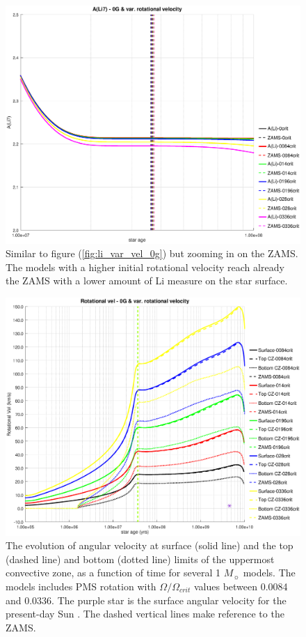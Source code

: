 \documentclass[fleqn,usenatbib]{mnras}
\begin{document}
\begin{figure}
	\includegraphics[trim = 40mm 15mm 20mm 15mm, clip,width=\columnwidth]{figures/li_var_vel_0_0g_z1.eps}
    \caption {Similar to figure (\ref{fig:li_var_vel_0g}) but zooming in on the ZAMS. The models with a higher initial rotational velocity reach already the ZAMS with a lower amount of Li measure on the star surface.}
    \label{fig:li_var_vel_0g_z1}
\end{figure}

\begin{figure}
	\includegraphics[trim = 40mm 15mm 20mm 15mm, clip,width=\columnwidth]{figures/rot_vel_var_vel_0_0g.eps}
    \caption{The evolution of angular velocity at surface (solid line) and the top (dashed line) and bottom (dotted line) limits of the uppermost convective zone, as a function of time for several 1 $M_{\sun}$ models. The models includes PMS rotation with $\Omega / \Omega_{crit}$ values between 0.0084 and 0.0336. The purple star is the surface angular velocity for the present-day Sun \citep{Gill2012}. The dashed vertical lines make reference to the ZAMS.}
    \label{fig:rot_vel_0g}
\end{figure}
\end{document}
